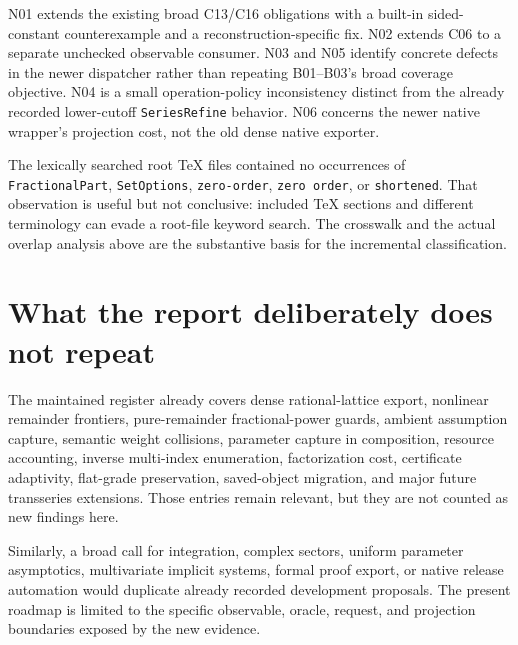 \documentclass[11pt,letterpaper]{article}
\newcommand{\code}[1]{\nolinkurl{#1}}
\begin{document}
N01 extends the existing broad C13/C16 obligations with a built-in sided-constant
counterexample and a reconstruction-specific fix. N02 extends C06 to a separate
unchecked observable consumer. N03 and N05 identify concrete defects in the
newer dispatcher rather than repeating B01--B03's broad coverage objective.
N04 is a small operation-policy inconsistency distinct from the already recorded
lower-cutoff \code{SeriesRefine} behavior. N06 concerns the newer native wrapper's
projection cost, not the old dense native exporter.

The lexically searched root TeX files contained no occurrences of
\code{FractionalPart}, \code{SetOptions}, \code{zero-order}, \code{zero order}, or
\code{shortened}. That observation is useful but not conclusive: included TeX
sections and different terminology can evade a root-file keyword search. The
crosswalk and the actual overlap analysis above are the substantive basis for
the incremental classification.

\section{What the report deliberately does not repeat}
The maintained register already covers dense rational-lattice export,
nonlinear remainder frontiers, pure-remainder fractional-power guards, ambient
assumption capture, semantic weight collisions, parameter capture in composition,
resource accounting, inverse multi-index enumeration, factorization cost,
certificate adaptivity, flat-grade preservation, saved-object migration, and
major future transseries extensions. Those entries remain relevant, but they
are not counted as new findings here.~\cite{register}

Similarly, a broad call for integration, complex sectors, uniform parameter
asymptotics, multivariate implicit systems, formal proof export, or native
release automation would duplicate already recorded development proposals.
The present roadmap is limited to the specific observable, oracle, request,
and projection boundaries exposed by the new evidence.
\end{document}
